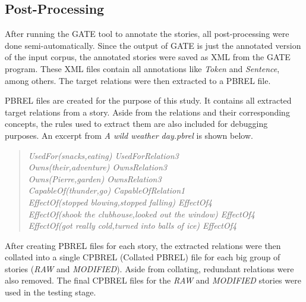 \subsection{Post-Processing}
\label{sec:postprocessing}

After running the GATE tool to annotate the stories, all post-processing were done semi-automatically. Since the output of GATE is just the annotated version of the input corpus, the annotated stories were saved as XML from the GATE program. These XML files contain all annotations like \textit{Token} and \textit{Sentence}, among others.  The target relations were then extracted to a PBREL file. 

PBREL files are created for the purpose of this study. It contains all extracted target relations from a story. Aside from the relations and their corresponding concepts, the rules used to extract them are also included for debugging purposes. An excerpt from \textit{A wild weather day.pbrel} is shown below.

\begin{verse}
\itshape
UsedFor(snacks,eating) UsedForRelation3 \\
Owns(their,adventure) OwnsRelation3\\
Owns(Pierre,garden) OwnsRelation3\\
CapableOf(thunder,go) CapableOfRelation1\\
EffectOf(stopped blowing,stopped falling) EffectOf4\\
EffectOf(shook the clubhouse,looked out the window) EffectOf4\\
EffectOf(got really cold,turned into balls of ice) EffectOf4\\
\end{verse}

After creating PBREL files for each story, the extracted relations were then collated into a single CPBREL (Collated PBREL) file for each big group of stories (\emph{RAW} and \emph{MODIFIED}). Aside from collating, redundant relations were also removed. The final CPBREL files for the \emph{RAW} and \emph{MODIFIED} stories were used in the testing stage.







